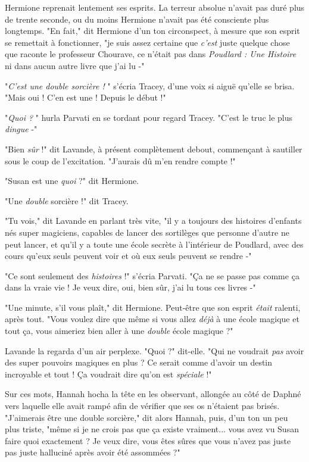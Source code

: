 Hermione reprenait lentement ses esprits. La terreur absolue n'avait pas duré plus de trente seconde, ou du moins Hermione n'avait pas été consciente plus longtemps. "En fait," dit Hermione d'un ton circonspect, à mesure que son esprit se remettait à fonctionner, "je suis assez certaine que \emph{c'est}  juste quelque chose que raconte le professeur Chourave, ce n'était pas dans \emph{Poudlard : Une Histoire}  ni dans aucun autre livre que j'ai lu -"

"\emph{C'est une double sorcière ! } " s'écria Tracey, d'une voix si aiguë qu'elle se brisa. "Mais oui ! C'en est une ! Depuis le début !"

"\emph{Quoi ?} " hurla Parvati en se tordant pour regard Tracey. "C'est le truc le plus \emph{dingue}  -"

"Bien \emph{sûr}  !" dit Lavande, à présent complètement debout, commençant à sautiller sous le coup de l'excitation. "J'aurais dû m'en rendre compte !"

"Susan est une \emph{quoi}  ?" dit Hermione.

"Une \emph{double}  sorcière !" dit Tracey.

"Tu vois," dit Lavande en parlant très vite, "il y a toujours des histoires d'enfants nés super magiciens, capables de lancer des sortilèges que personne d'autre ne peut lancer, et qu'il y a toute une école secrète à l'intérieur de Poudlard, avec des cours qu'eux seuls peuvent voir et où eux seuls peuvent se rendre -"

"Ce sont seulement des \emph{histoires}  !" s'écria Parvati. "Ça ne se passe pas comme ça dans la vraie vie ! Je veux dire, oui, bien sûr, j'ai lu tous ces livres -"

"Une minute, s'il vous plaît," dit Hermione. Peut-être que son esprit \emph{était}  ralenti, après tout. "Vous voulez dire que même si vous allez \emph{déjà}  à une école magique et tout ça, vous aimeriez bien aller à une \emph{double}  école magique ?"

Lavande la regarda d'un air perplexe. "Quoi ?" dit-elle. "Qui ne voudrait \emph{pas}  avoir des super pouvoirs magiques en plus ? Ce serait comme d'avoir un destin incroyable et tout ! Ça voudrait dire qu'on est \emph{spéciale}  !"

Sur ces mots, Hannah hocha la tête en les observant, allongée au côté de Daphné vers laquelle elle avait rampé afin de vérifier que ses os n'étaient pas brisés. "J'aimerais être une double sorcière," dit alors Hannah, puis, d'un ton un peu plus triste, "même si je ne crois pas que ça existe vraiment... vous avez vu Susan faire quoi exactement ? Je veux dire, vous êtes sûres que vous n'avez pas juste pas juste halluciné après avoir été assommées ?"

